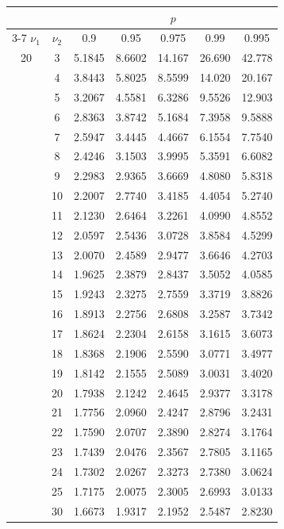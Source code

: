 \hfill
\begin{minipage}[t]{0.49\textwidth}
	\centering
	\begin{tabular}{ccccccc}
		& & \multicolumn{5}{c}{$p$}\\
		\cline{3-7}
		$\nu_1$ & $\nu_2$ & 0.9 & 0.95 & 0.975 & 0.99 & 0.995 \\
		\midrule
		20 & 3 & 5.1845 & 8.6602 & 14.167 & 26.690 & 42.778 \\
		& 4 & 3.8443 & 5.8025 & 8.5599 & 14.020 & 20.167 \\
		& 5 & 3.2067 & 4.5581 & 6.3286 & 9.5526 & 12.903 \\
		& 6 & 2.8363 & 3.8742 & 5.1684 & 7.3958 & 9.5888 \\
		& 7 & 2.5947 & 3.4445 & 4.4667 & 6.1554 & 7.7540 \\
		& 8 & 2.4246 & 3.1503 & 3.9995 & 5.3591 & 6.6082 \\
		& 9 & 2.2983 & 2.9365 & 3.6669 & 4.8080 & 5.8318 \\[5pt]
		& 10 & 2.2007 & 2.7740 & 3.4185 & 4.4054 & 5.2740 \\
		& 11 & 2.1230 & 2.6464 & 3.2261 & 4.0990 & 4.8552 \\
		& 12 & 2.0597 & 2.5436 & 3.0728 & 3.8584 & 4.5299 \\
		& 13 & 2.0070 & 2.4589 & 2.9477 & 3.6646 & 4.2703 \\
		& 14 & 1.9625 & 2.3879 & 2.8437 & 3.5052 & 4.0585 \\
		& 15 & 1.9243 & 2.3275 & 2.7559 & 3.3719 & 3.8826 \\
		& 16 & 1.8913 & 2.2756 & 2.6808 & 3.2587 & 3.7342 \\
		& 17 & 1.8624 & 2.2304 & 2.6158 & 3.1615 & 3.6073 \\
		& 18 & 1.8368 & 2.1906 & 2.5590 & 3.0771 & 3.4977 \\
		& 19 & 1.8142 & 2.1555 & 2.5089 & 3.0031 & 3.4020 \\[5pt]
		& 20 & 1.7938 & 2.1242 & 2.4645 & 2.9377 & 3.3178 \\
		& 21 & 1.7756 & 2.0960 & 2.4247 & 2.8796 & 3.2431 \\
		& 22 & 1.7590 & 2.0707 & 2.3890 & 2.8274 & 3.1764 \\
		& 23 & 1.7439 & 2.0476 & 2.3567 & 2.7805 & 3.1165 \\
		& 24 & 1.7302 & 2.0267 & 2.3273 & 2.7380 & 3.0624 \\
		& 25 & 1.7175 & 2.0075 & 2.3005 & 2.6993 & 3.0133 \\
		& 30 & 1.6673 & 1.9317 & 2.1952 & 2.5487 & 2.8230 \\

\end{tabular}
\end{minipage}
